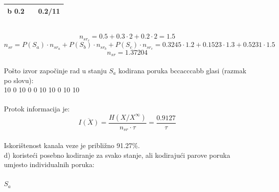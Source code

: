 \documentclass[12pt]{article}
\begin{document}
\begin{enumerate}
\begin{tabular}{|l|l|l}
b 0.2 &                & \multicolumn{1}{l|}{\textbf{0.2/11}} \\ \hline
\end{tabular}
\\
\begin{equation*}
    n_{sr_{c}} = 0.5 + 0.3\cdot2 + 0.2\cdot2 = 1.5
\end{equation*}
 \begin{equation*}
     n_{sr} = P(S_a) \cdot n_{sr_{a}} + P(S_b) \cdot n_{sr_{b}} + P(S_c) \cdot n_{sr_{c}} = 0.3245\cdot1.2 + 0.1523\cdot1.3 + 0.5231\cdot1.5
 \end{equation*}
 \begin{equation*}
     n_{sr} = 1.37204
 \end{equation*} \\
  Pošto izvor započinje rad u stanju $S_a$ kodirana poruka bccacccabb glasi (razmak po slovu):\\ 
  10 0 10 0 0 10 10 0 10 10 \\
  \\
  Protok informacija je:
 \begin{equation*}
    \overline{I(X)} = \frac{H(X/X^\infty)}{n_{sr} \cdot \tau} = \frac{0.9127}{\tau}
\end{equation*}
\\
Iskorištenost kanala veze je približno 91.27\%.
\\
\newpage
d) koristeći posebno kodiranje za svako stanje, ali kodirajući parove poruka umjesto individualnih poruka:
\\
\\
$S_a$
\\	


\end{enumerate}
\end{document}
